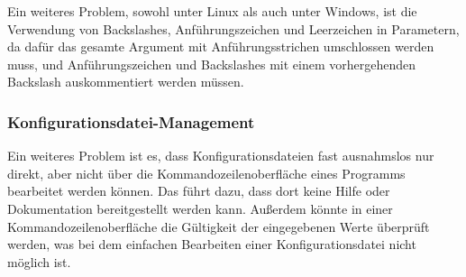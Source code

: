 Ein weiteres Problem, sowohl unter Linux als auch unter Windows, ist die Verwendung von Backslashes, Anführungszeichen und Leerzeichen in Parametern, da dafür das gesamte Argument mit Anführungsstrichen umschlossen werden muss, und Anführungszeichen und Backslashes mit einem vorhergehenden Backslash auskommentiert werden müssen.
\subsubsection{Konfigurationsdatei-Management}
Ein weiteres Problem ist es, dass Konfigurationsdateien fast ausnahmslos nur direkt, aber nicht über die
Kommandozeilenoberfläche eines Programms bearbeitet werden können.
Das führt dazu, dass dort keine Hilfe oder Dokumentation bereitgestellt werden kann.
Außerdem könnte in einer Kommandozeilenoberfläche die Gültigkeit der eingegebenen Werte
überprüft werden, was bei dem einfachen Bearbeiten einer Konfigurationsdatei nicht möglich ist.